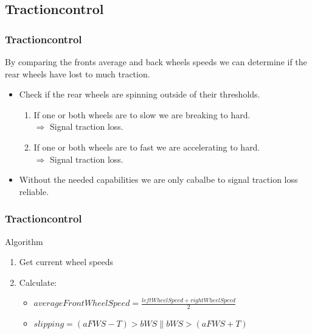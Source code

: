 \documentclass{beamer}
\begin{document}
\subsection{Tractioncontrol}
\begin{frame}
    \frametitle{Tractioncontrol}
    By comparing the fronts average and back wheels speeds we can determine if the rear wheels have lost to much traction.
    \begin{itemize}
    \item Check if the rear wheels are spinning outside of their thresholds.\\
        \begin{enumerate}
        \item If one or both wheels are to slow we are breaking to hard.\\
        $\Rightarrow$ Signal traction loss.\\
        \item If one or both wheels are to fast we are accelerating to hard.\\
        $\Rightarrow$ Signal traction loss.
        \end{enumerate}
     \item Without the needed capabilities we are only cabalbe to signal traction loss reliable.
    \end{itemize}
\end{frame}
\begin{frame}
    \frametitle{Tractioncontrol}
    Algorithm
    \begin{enumerate}
        \item Get current wheel speeds
        \item Calculate: 
        \begin{itemize}
            \item $averageFrontWheelSpeed = \frac{leftWheelSpeed + rightWheelSpeed}{2}$
            \item $slipping = (aFWS-T) > bWS \parallel bWS > (aFWS+T)$
        \end{itemize}
    \end{enumerate}
\end{frame}
\end{document}
